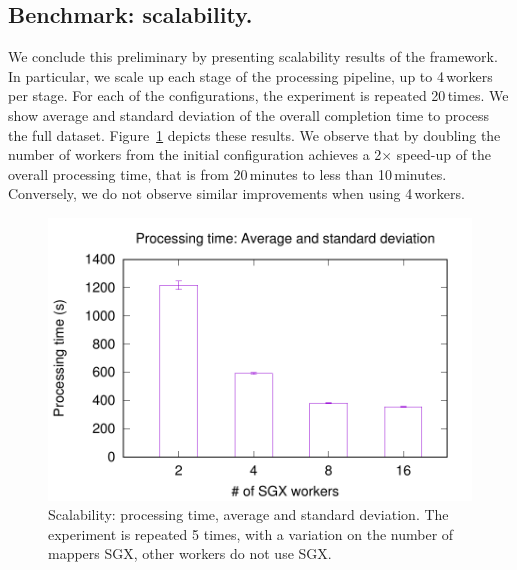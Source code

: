 

\subsection{Benchmark: scalability.} We conclude this preliminary by presenting scalability results of the \SYS framework.
In particular, we scale up each stage of the processing pipeline, up to 4\,workers per stage.
For each of the configurations, the experiment is repeated 20\,times.
We show average and standard deviation of the overall completion time to process the full dataset.
Figure~\ref{fig:scalability} depicts these results.
We observe that by doubling the number of workers from the initial configuration achieves a 2$\times$ speed-up of the overall processing time, that is from 20\,minutes to less than 10\,minutes.
Conversely, we do not observe similar improvements when using 4\,workers.

\begin{figure}[t!]
  \centering
  \includegraphics[scale=0.5]{plots/secure_streams/scalability/sgxmapper_scalability.pdf}
  \caption{Scalability: processing time, average and standard deviation. The experiment is repeated 5 times, with a variation on the number of mappers SGX, other workers do not use SGX.}
  \label{fig:scalability}
\end{figure}

